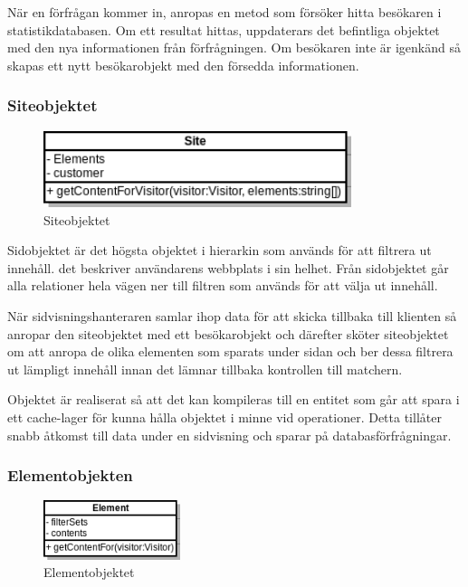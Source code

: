 När en förfrågan kommer in, anropas en metod som försöker hitta besökaren i statistikdatabasen. Om ett resultat hittas, uppdaterars det befintliga objektet med den nya informationen från förfrågningen. Om besökaren inte är igenkänd så skapas ett nytt besökarobjekt med den försedda informationen.

\subsubsection{Siteobjektet}

\begin{figure}[h!]
\centering
\includegraphics[width=90mm]{assets/images/umlSite.png}
\caption{Siteobjektet}
\label{siteuml}
\end{figure}

Sidobjektet är det högsta objektet i hierarkin som används för att filtrera ut innehåll. det beskriver användarens webbplats i sin helhet. Från sidobjektet går alla relationer hela vägen ner till filtren som används för att välja ut innehåll.

När sidvisningshanteraren samlar ihop data för att skicka tillbaka till klienten så anropar den siteobjektet med ett besökarobjekt och därefter sköter siteobjektet om att anropa de olika elementen som sparats under sidan och ber dessa filtrera ut lämpligt innehåll innan det lämnar tillbaka kontrollen till matchern.

Objektet är realiserat så att det kan kompileras till en entitet som går att spara i ett cache-lager för kunna hålla objektet i minne vid operationer. Detta tillåter snabb åtkomst till data under en sidvisning och sparar på databasförfrågningar.

\subsubsection{Elementobjekten}

\begin{figure}[h!]
\centering
\includegraphics[width=40mm]{assets/images/umlElement.png}
\caption{Elementobjektet}
\label{elementuml}
\end{figure}

